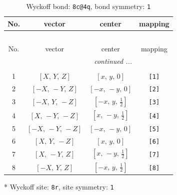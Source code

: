 \documentclass[fleqn,8pt]{jsarticle}
\begin{document}
\renewcommand{\arraystretch}{1.2}
\begin{longtable}{cccc}
\caption{Wyckoff bond: {\tt 8c@4q}, bond symmetry: {\tt 1}}
 \\
 \hline \hline
No. & vector & center & mapping \\ \hline \endfirsthead

\multicolumn{3}{l}{\tablename\ \thetable{}} \\
 \hline \hline
No. & vector & center & mapping \\ \hline \endhead

 \hline \hline
\multicolumn{3}{r}{\footnotesize\it continued ...} \\ \endfoot

 \hline \hline
\multicolumn{3}{r}{} \\ \endlastfoot

1 & $\left[ X,\, Y,\, Z \right]$ & $\left[ x,\, y,\, 0 \right]$ & {\tt [1]} \\ \hline
2 & $\left[ - X,\, - Y,\, Z \right]$ & $\left[ - x,\, - y,\, 0 \right]$ & {\tt [2]} \\ \hline
3 & $\left[ - X,\, Y,\, - Z \right]$ & $\left[ - x,\, y,\, \frac{1}{2} \right]$ & {\tt [3]} \\ \hline
4 & $\left[ X,\, - Y,\, - Z \right]$ & $\left[ x,\, - y,\, \frac{1}{2} \right]$ & {\tt [4]} \\ \hline
5 & $\left[ - X,\, - Y,\, - Z \right]$ & $\left[ - x,\, - y,\, 0 \right]$ & {\tt [5]} \\ \hline
6 & $\left[ X,\, Y,\, - Z \right]$ & $\left[ x,\, y,\, 0 \right]$ & {\tt [6]} \\ \hline
7 & $\left[ X,\, - Y,\, Z \right]$ & $\left[ x,\, - y,\, \frac{1}{2} \right]$ & {\tt [7]} \\ \hline
8 & $\left[ - X,\, Y,\, Z \right]$ & $\left[ - x,\, y,\, \frac{1}{2} \right]$ & {\tt [8]} \\
\end{longtable}
* Wyckoff site: {\tt 8r}, site symmetry: {\tt 1}
\renewcommand{\arraystretch}{1.2}
\end{document}
